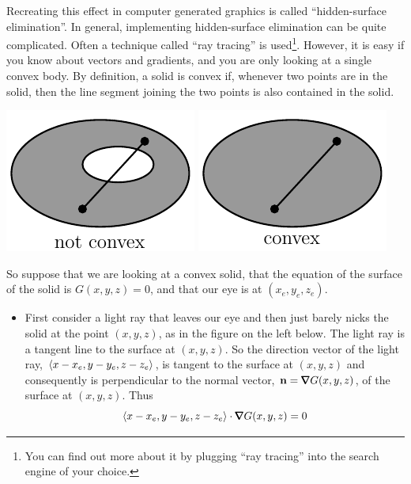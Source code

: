 \begin{eg}
Recreating this effect in computer generated graphics is called ``hidden-surface elimination''.  In general, implementing hidden-surface elimination can be quite complicated. Often a technique called ``ray tracing'' is used\footnote{You can find out more about it by plugging ``ray tracing'' into the search engine of your choice.}. However, it is easy if you know about vectors and gradients, and 
you are only looking at a single convex body. By definition, a solid is convex if, whenever two points are in the solid, then the line segment joining the two points is also contained in the solid. 
\begin{efig}
\begin{center}
   \includegraphics{hiddenB.pdf}\qquad
   \includegraphics{hiddenC.pdf}
\end{center}
\end{efig}

So suppose that we are looking at a convex solid, that the equation of the 
surface of the solid is $G(x,y,z)=0$, and that our eye is at $(x_e,y_e,z_e)$.
\begin{itemize}
\item
First consider a light ray that leaves our eye and then just barely nicks
the solid at the point $(x,y,z)$, as in the figure on the left below. The light ray is a tangent line to the surface at $(x,y,z)$. So the direction vector of 
the light ray,
 $\left< x-x_e,y-y_e,z-z_e \right>$, is tangent to the surface at $(x,y,z)$  and consequently is perpendicular to the normal vector, 
$\vn=\vnabla G(x,y,z)$, of the surface at $(x,y,z)$. Thus 
\begin{equation*}
\llt x-x_e,y-y_e,z-z_e \rgt\cdot \vnabla G(x,y,z)=0
\end{equation*}


\end{itemize}
\end{eg}
